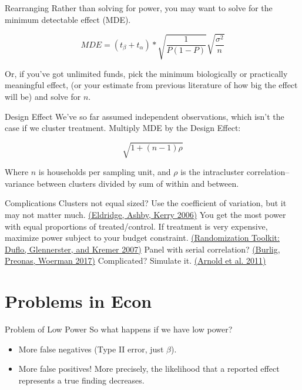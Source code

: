 \documentclass{beamer}
\begin{document}
\begin{frame}{Rearranging}
Rather than solving for power, you may want to solve for the minimum detectable effect (MDE). 

\[MDE = \left( t_{\beta} + t_{\alpha} \right)*\sqrt{\frac{1}{P(1 - P)}}\sqrt{\frac{\sigma^{2}}{n}}\]

Or, if you've got unlimited funds, pick the minimum biologically or practically meaningful effect, (or your estimate from previous literature of how big the effect will be) and solve for $n$.
\end{frame}

\begin{frame}{Design Effect}
We've so far assumed independent observations, which isn't the case if we cluster treatment. Multiply MDE by the Design Effect:

$$\sqrt{1+(n-1)\rho}$$

Where $n$ is households per sampling unit, and $\rho$ is the intracluster correlation--variance between clusters divided by sum of within and between.
\end{frame}

\begin{frame}{Complications}
Clusters not equal sized? Use the coefficient of variation, but it may not matter much. \href{https://doi.org/10.1093/ije/dyl129}{(Eldridge, Ashby, Kerry 2006)}
\vskip0.25in
You get the most power with equal proportions of treated/control. If treatment is very expensive, maximize power subject to your budget constraint. \href{http://www.sciencedirect.com/science/article/pii/S1573447107040612}{(Randomization Toolkit: Duflo, Glennerster, and Kremer 2007)}
\vskip0.25in
Panel with serial correlation? \href{https://static1.squarespace.com/static/558eff8ce4b023b6b855320a/t/59e932358dd041e0d712fff8/1508454965886/BPW\_Power\_Calculations\_2017\_10\_19.pdf}{(Burlig, Preonas, Woerman 2017)}
\vskip0.25in
Complicated? Simulate it. \href{https://doi.org/10.1186/1471-2288-11-94}{(Arnold et al. 2011)}
\end{frame}

\section{Problems in Econ}
\begin{frame}{Problem of Low Power}
So what happens if we have low power?
\begin{itemize}
\item
More false negatives (Type II error, just $\beta$).
\item
More false positives! More precisely, the likelihood that a reported effect represents a true finding decreases.
\end{itemize}
\end{frame}
\end{document}
